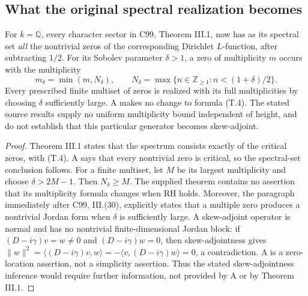 \subsection{What the original spectral realization becomes}

\begin{proposition}
\label{AC-T03}
For \(k=\mathbb Q\), every character sector in C99,
Theorem III.1, now has as its spectral set \emph{all} the
nontrivial zeros of the corresponding Dirichlet \(L\)-function,
after subtracting \(1/2\). For its Sobolev parameter
\(\delta>1\), a zero of multiplicity \(m\) occurs with the
multiplicity
\[
 m_\delta=\min(m,N_\delta),\qquad
 N_\delta=\max\{n\in\mathbb Z_{\geq1}:n<(1+\delta)/2\}.    \tag{T.4}
\]
Every prescribed finite multiset of zeros is realized with
its full multiplicities by choosing \(\delta\) sufficiently
large. A makes no change to formula (T.4). The stated source
results supply no uniform multiplicity bound independent
of height, and do not establish that this particular
generator becomes skew-adjoint.
\end{proposition}

\begin{proof}
Theorem III.1 states that the spectrum consists exactly of
the critical zeros, with (T.4). A says that every nontrivial
zero is critical, so the spectral-set conclusion follows.
For a finite multiset, let \(M\) be its largest multiplicity
and choose \(\delta>2M-1\). Then \(N_\delta\geq M\).
The supplied theorem contains no assertion that its
multiplicity formula changes when RH holds. Moreover,
the paragraph immediately after C99, III.(30), explicitly
states that a multiple zero produces a nontrivial Jordan
form when \(\delta\) is sufficiently large. A skew-adjoint
operator is normal and has no nontrivial finite-dimensional
Jordan block: if \((D-i\gamma)v=w\ne0\) and
\((D-i\gamma)w=0\), then skew-adjointness gives
\(\|w\|^2=\langle (D-i\gamma)v,w\rangle
=-\langle v,(D-i\gamma)w\rangle=0\), a contradiction.
A is a zero-location assertion, not a simplicity assertion.
Thus the stated skew-adjointness inference would require
further information, not provided by A or by Theorem III.1.
\end{proof}


